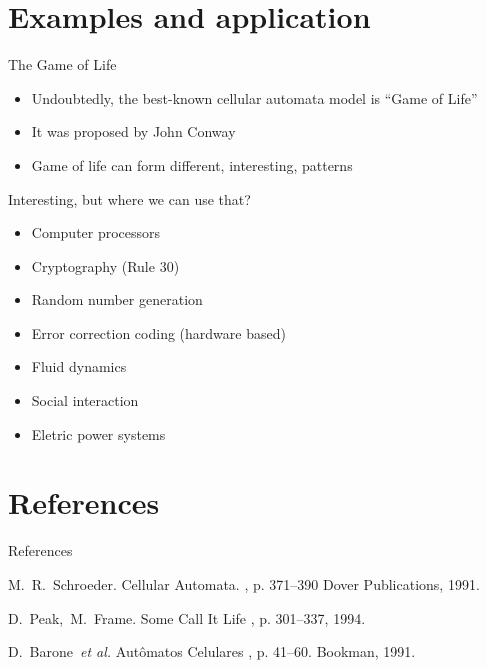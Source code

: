 \documentclass{beamer}
\begin{document}
\section{Examples and application}
\begin{frame}{The Game of Life}
\begin{itemize}
  \item Undoubtedly, the best-known cellular automata model is ``Game of Life''
  \item It was proposed by John Conway
  \item Game of life can form different, interesting, patterns
\end{itemize}
\end{frame}



\begin{frame}{Interesting, but where we can use that?}
\begin{itemize}
  \item Computer processors
  \item Cryptography (Rule 30)
  \item Random number generation
  \item Error correction coding (hardware based)
  \item Fluid dynamics
  \item Social interaction
  \item Eletric power systems
\end{itemize}
\end{frame}

\section{References}
\begin{frame}{References}
\begin{thebibliography}{Schroeder, 1991}
  M.~R.~Schroeder.
  \newblock Cellular Automata.
  , p. 371--390
  \newblock Dover Publications, 1991.  
    
  D.~Peak,~M.~Frame.
  \newblock Some Call It Life
  , p. 301--337, 1994.
  
  D.~Barone~\textit{et al.}
  \newblock Autômatos Celulares
  , p. 41--60.
  \newblock Bookman, 1991.  
\end{thebibliography}
\end{frame}
\end{document}
